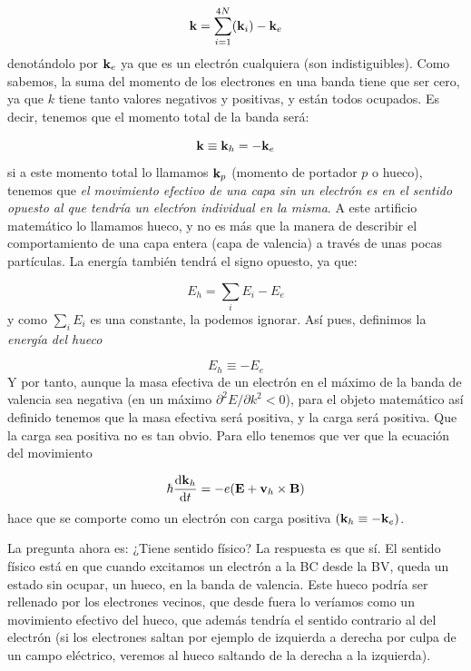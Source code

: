 \begin{equation}
	\mathbf{k} = \sum_{i=1}^{4N} (\mathbf{k}_i) - \mathbf{k}_e
\end{equation}
denotándolo por $\mathbf{k}_e$ ya que es un electrón cualquiera (son indistiguibles). Como sabemos, la suma del momento de los electrones en una banda tiene que ser cero, ya que $k$ tiene tanto valores negativos y positivas, y están todos ocupados. Es decir, tenemos que el momento total de la banda será:

\begin{equation}
	\mathbf{k} \equiv \mathbf{k}_h = - \mathbf{k}_e
\end{equation}
si a este momento total lo llamamos $\mathbf{k}_p$ (momento de portador $p$ o hueco), tenemos que \textit{el movimiento efectivo de una capa sin un electrón es en el sentido opuesto al que tendría un electŕon individual en la misma}. A este artificio matemático lo llamamos hueco, y no es más que la manera de describir el comportamiento de una capa entera (capa de valencia) a través de unas pocas partículas. La energía también tendrá el signo opuesto, ya que:

\begin{equation}
	E_h = \sum_{i} E_i - E_e
\end{equation}
y como $\sum_{i}E_i$ es una constante, la podemos ignorar. Así pues, definimos la \textit{energía del hueco}

\begin{equation}
	E_h \equiv - E_e
\end{equation}
Y por tanto, aunque la masa efectiva de un electrón en el máximo de la banda de valencia sea negativa (en un máximo $\partial^2 E/ \partial k^2<0$), para el objeto matemático así definido tenemos que la masa efectiva será positiva, y la carga será positiva. Que la carga sea positiva no es tan obvio. Para ello tenemos que ver que la ecuación del movimiento

\begin{equation}
	\hbar \frac{\mathrm{d} \mathbf{k}_h}{\mathrm{d} t} = -e(\mathbf{E} + \mathbf{v}_h \times \mathbf{B})
\end{equation}
hace que se comporte como un electrón con carga positiva $(\mathbf{k}_h \equiv - \mathbf{k}_e)$. 

La pregunta ahora es: ¿Tiene sentido físico? La respuesta es que sí. El sentido físico está en que cuando excitamos un electrón a la BC desde la BV, queda un estado sin ocupar, un hueco, en la banda de valencia. Este hueco podría ser rellenado por los electrones vecinos, que desde fuera lo veríamos como un movimiento efectivo del hueco, que además tendría el sentido contrario al del electrón (si los electrones saltan por ejemplo de izquierda a derecha por culpa de un campo eléctrico, veremos al hueco saltando de la derecha a la izquierda).


